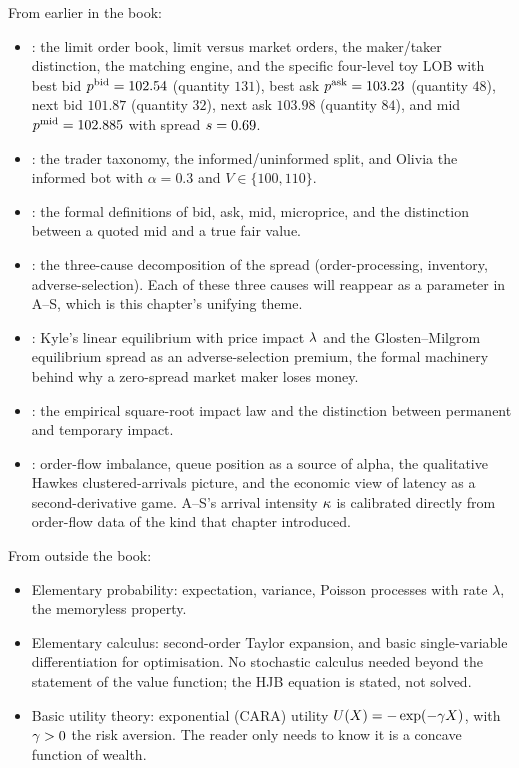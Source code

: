 \begin{backgroundbox}[Prerequisites]
From earlier in the book:
\begin{itemize}
  \item {}: the limit order book, limit versus market
  orders, the maker/taker distinction, the matching engine, and
  the specific four-level toy LOB with best bid
  $p^{\mathrm{bid}} = 102.54$ (quantity $131$), best ask
  $p^{\mathrm{ask}} = 103.23$ (quantity $48$), next bid $101.87$ (quantity
  $32$), next ask $103.98$ (quantity $84$), and mid
  $p^{\mathrm{mid}} = 102.885$ with spread $s = 0.69$.
  \item {}: the trader taxonomy, the
  informed/uninformed split, and Olivia the informed bot with
  $\alpha = 0.3$ and $V \in \{100, 110\}$.
  \item {}: the formal definitions of bid,
  ask, mid, microprice, and the distinction between a quoted
  mid and a true fair value.
  \item {}: the three-cause decomposition of
  the spread (order-processing, inventory, adverse-selection).
  Each of these three causes will reappear as a parameter in
  A--S, which is this chapter's unifying theme.
  \item {}: Kyle's linear equilibrium with
  price impact $\lambda$ and the Glosten--Milgrom equilibrium
  spread as an adverse-selection premium, the formal
  machinery behind why a zero-spread market maker loses money.
  \item {}: the empirical square-root
  impact law and the distinction between permanent and
  temporary impact.
  \item {}: order-flow imbalance, queue
  position as a source of alpha, the qualitative Hawkes
  clustered-arrivals picture, and the economic view of latency
  as a second-derivative game. A--S's arrival intensity
  $\kappa$ is calibrated directly from order-flow data of the
  kind that chapter introduced.
\end{itemize}
From outside the book:
\begin{itemize}
  \item Elementary probability: expectation, variance, Poisson
  processes with rate $\lambda$, the memoryless property.
  \item Elementary calculus: second-order Taylor expansion, and
  basic single-variable differentiation for optimisation. No
  stochastic calculus needed beyond the statement of the value
  function; the HJB equation is stated, not solved.
  \item Basic utility theory: exponential (CARA) utility
  $U(X) = -\exp(-\gamma X)$, with $\gamma > 0$ the risk
  aversion. The reader only needs to know it is a concave
  function of wealth.
\end{itemize}
\end{backgroundbox}


